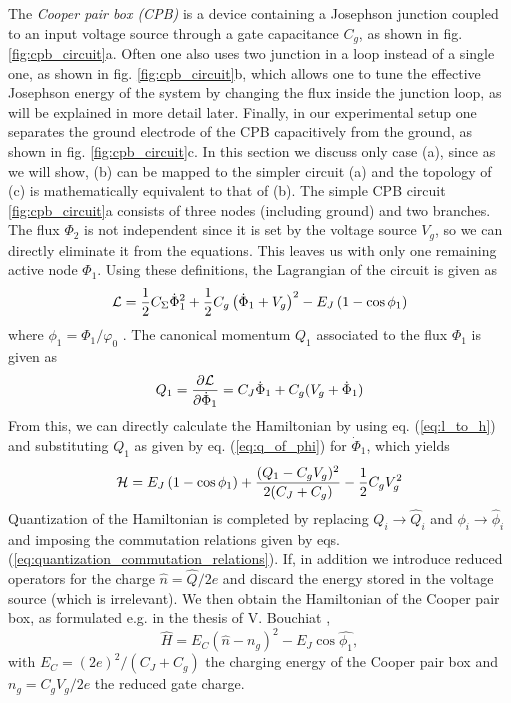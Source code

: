 The {\it Cooper pair box (CPB)} is a device containing a Josephson junction coupled to an input voltage source through a gate capacitance $C_g$, as shown in fig. \ref{fig:cpb_circuit}a. Often one also uses two junction in a loop instead of a single one, as shown in fig. \ref{fig:cpb_circuit}b, which allows one to tune the effective Josephson energy of the system by changing the flux inside the junction loop, as will be explained in more detail later. Finally, in our experimental setup one separates the ground electrode of the CPB capacitively from the ground, as shown in fig. \ref{fig:cpb_circuit}c. In this section we discuss only case (a), since as we will show, (b) can be mapped to the simpler circuit (a) and the topology of (c) is mathematically equivalent to that of (b). The simple CPB circuit \ref{fig:cpb_circuit}a consists of  three nodes (including ground) and two branches. The flux $\Phi_2$ is not independent since it is set by the voltage source $V_g$, so we can directly eliminate it from the equations. This leaves us with only one remaining active node $\Phi_1$. Using these definitions, the Lagrangian of the circuit is given as
%
\begin{equation}
\begin{mathcal}L\end{mathcal}=\frac{1}{2}C_\Sigma\dot{\Phi}_1^2+\frac{1}{2}C_g\left(\dot{\Phi}_1+V_g\right)^2-E_J\left(1-\cos{\phi_1}\right)
\end{equation}
%
where $\phi_1=\Phi_1/\varphi_0$ . The canonical momentum $Q_1$ associated to the flux $\Phi_1$ is given as
%
\begin{equation}
Q_1 = \frac{\partial \begin{mathcal}L\end{mathcal}}{\partial \dot{\Phi}_1} = C_J \dot{\Phi}_1+C_g(V_g+\dot{\Phi}_1) \label{eq:q_of_phi}
\end{equation}
%
From this, we can directly calculate the Hamiltonian by using eq. (\ref{eq:l_to_h}) and substituting $Q_1$ as given by eq. (\ref{eq:q_of_phi}) for $\dot{\Phi}_1$, which yields
%
\begin{equation}
\begin{mathcal}H\end{mathcal} = E_J\left(1-\cos{\phi_1}\right)+\frac{(Q_1-C_g V_g)^2}{2(C_J+C_g)}-\frac{1}{2}C_g V_g^2
\end{equation}
%
Quantization of the Hamiltonian is completed by replacing $Q_i\to \hat{Q}_i$ and $\phi_i\to\hat{\phi}_i$ and imposing the commutation relations given by eqs. (\ref{eq:quantization_commutation_relations}). If, in addition we introduce reduced operators for the charge $\hat{n}=\hat{Q}/2e$ and discard the energy stored in the voltage source (which is irrelevant). We then obtain the Hamiltonian of the Cooper pair box, as formulated e.g. in the thesis of V. Bouchiat \citep{bouchiat_quantum_1998},
%
\begin{equation}
\hat{H} = E_C \left( \hat{n} - n_g\right)^2-E_J \cos{\hat{\phi_1}}, \label{eq:cpb_hamiltonian}
\end{equation}
%
with $E_C = (2e)^2 / (C_J+C_g)$ the charging energy of the Cooper pair box and $n_g=C_g V_g /2e $ the reduced gate charge.


